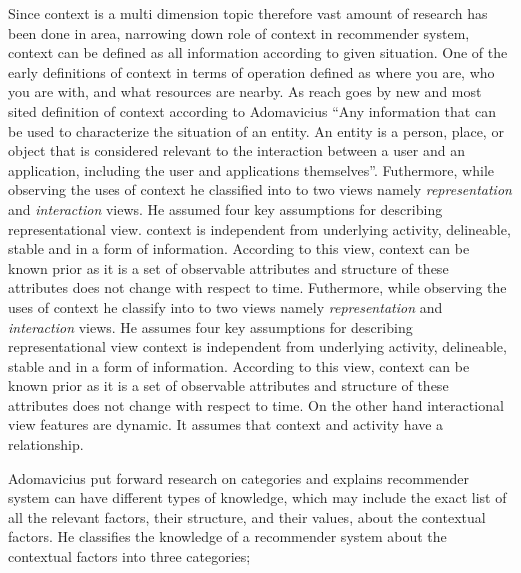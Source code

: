 Since context is a multi dimension topic therefore vast amount of research has been done in area, narrowing down role of context in recommender system, context can be defined as all information according to given situation. One of the early definitions of context in terms of operation \cite[Schilit, 1994]{schilit1994disseminating} defined as where you are, who you are with, and what resources are nearby.  As reach goes by new and most sited definition of context according to Adomavicius \cite[Adomavicius, 2011]{adomavicius2011context} “Any information  that  can  be  used  to characterize  the  situation  of  an entity.  An entity is a person, place, or object that is considered relevant to the interaction between a user and an application, including the user and applications  themselves”. Futhermore, \cite[Dourish, 2004]{dourish2004we} while observing the uses of context he classified into to two views namely \textit{ representation } and \textit{ interaction } views.  He assumed four key assumptions for describing representational view. context is independent from underlying activity, delineable, stable and in a form of information. According to this view, context can be known prior as it is a set of observable attributes and structure of these attributes does not change with respect to  time. Futhermore, \cite[Dourish, 2004]{dourish2004we} while observing the uses of context he classify into to two views namely \textit{ representation } and \textit{ interaction } views.  He assumes four key assumptions for describing representational view context is independent from underlying activity, delineable, stable and in a form of information. According to this view, context can be known prior as it is a set of observable attributes and structure of these attributes does not change with respect to time. On the other hand interactional view features are dynamic. It assumes that context and activity have a relationship.\newline

Adomavicius \cite[Adomavicius, 2011]{adomavicius2011context} put forward research \cite[Dourish, 2004]{dourish2004we} on categories  and  explains recommender system can have different types of knowledge, which may include the exact list of all the relevant factors, their structure, and their values, about the contextual factors. He classifies the knowledge of a recommender system about the contextual factors into three categories; \newline

